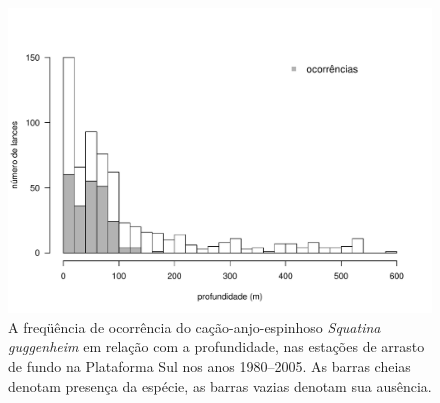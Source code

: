 \documentclass[a4paper,11pt,twoside,showtrims,onecolumn,openright,final]{memoir}
\begin{document}
\begin{figure}
\begin{center}
\includegraphics[width=\textwidth]{GUGGENHEIM_DISTRIBPROF}
\end{center}
\caption[A freqüência de ocorrência do cação-anjo-espinhoso \emph{Squatina guggenheim} 
	em relação com a profundidade, nas estações de arrasto de 
	fundo na Plataforma Sul nos anos 1980--2005]
	{A freqüência de ocorrência do cação-anjo-espinhoso \emph{Squatina guggenheim} 
	em relação com a profundidade, nas estações de arrasto de 
	fundo na Plataforma Sul nos anos 1980--2005. 
	As barras cheias denotam presença da espécie, 
	as barras vazias denotam sua ausência.}
\label{fig:fo-guggenheim-profundidade}
\end{figure}


%
%
\end{document}
